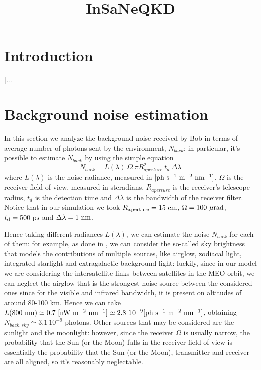 \documentclass[twocolumn]{article}
\title{InSaNeQKD}
\author{}
\date{}
\begin{document}
	
	\maketitle
	
	\section{Introduction}
	[...]
	\section{Background noise estimation}
	In this section we analyze the background noise received by Bob in terms of average number of photons  sent by the environment, $N_{back}$: in particular, it's possible to estimate $N_{back}$ by using the simple equation
	\begin{equation}
	N_{back}= L(\lambda)\ \Omega\ \pi R_{aperture}^2\ t_d\ \Delta\lambda
	\end{equation}
	where $L(\lambda)$ is the noise radiance, measured in ${[\rm ph\ s^{-1}\ m^{-2}\ nm^{-1}]}$, $\Omega$ is the receiver field-of-view, measured in steradians, $R_{aperture}$ is the receiver's telescope radius, $t_d$ is the detection time and $\Delta\lambda$ is the bandwidth of the receiver filter. Notice that in our simulation we took $R_{\rm aperture}=15\ {\rm cm}$, $\Omega = 100\ {\rm \mu rad}$, $t_{\rm d} = 500\ {\rm ps}$ and $\Delta\lambda = 1\ {\rm nm}$.
	
	Hence taking different radiances $L(\lambda)$, we can estimate the noise $N_{back}$ for each of them: for example, as done in \cite{tomaello11}, we can consider the so-called sky brightness that models the contributions of multiple sources, like airglow, zodiacal light, integrated starlight and extragalactic background light: luckily, since in our model we are considering the intersatellite links between satellites in the MEO orbit, we can neglect the airglow that is the strongest noise source between the considered ones \cite{leinert98} since for the visible and infrared bandwidth, it is present on altitudes of around 80-100 km. Hence we can take $L( 800\ {\rm nm}) \simeq0.7\ [\rm nW\ m^{-2}\ nm^{-1}]\simeq2.8\ 10^{-9} {[\rm ph\ s^{-1}\ m^{-2}\ nm^{-1}]}$, obtaining $N_{back,sky}\simeq 3.1\ 10^{-9}$ photons.
	Other sources that may be considered are the sunlight and the moonlight: however, since the receiver $\Omega$ is usually narrow, the probability that the Sun (or the Moon) falls in the receiver field-of-view is essentially the probability that the Sun (or the Moon), transmitter and receiver are all aligned, so it's reasonably neglectable.
	
\end{document}
